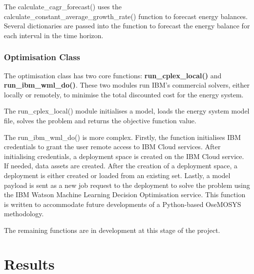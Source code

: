 \documentclass[12pt]{article}
\begin{document}
The calculate\_cagr\_forecast() uses the calculate\_constant\_average\_growth\_rate() function to forecast energy balances.
Several dictionaries are passed into the function to forecast the energy balance for each interval in the time horizon.

\subsubsection{Optimisation Class}\label{optimisation}
The optimisation class has two core functions: \textbf{run\_cplex\_local()} and \textbf{run\_ibm\_wml\_do()}.
These two modules run IBM's commercial solvers, either locally or remotely, to minimise the total discounted cost for the energy system.

The run\_cplex\_local() module initialises a model, loads the energy system model file, solves the problem and returns the objective function value.

The run\_ibm\_wml\_do() is more complex.
Firstly, the function initialises IBM credentials to grant the user remote access to IBM Cloud services.
After initialising credentials, a deployment space is created on the IBM Cloud service.
If needed, data assets are created.
After the creation of a deployment space, a deployment is either created or loaded from an existing set.
Lastly, a model payload is sent as a new job request to the deployment to solve the problem using the IBM Watson Machine Learning Decision Optimisation service.
This function is written to accommodate future developments of a Python-based OseMOSYS methodology.

The remaining functions are in development at this stage of the project.
\newpage
\section{Results}
\end{document}
